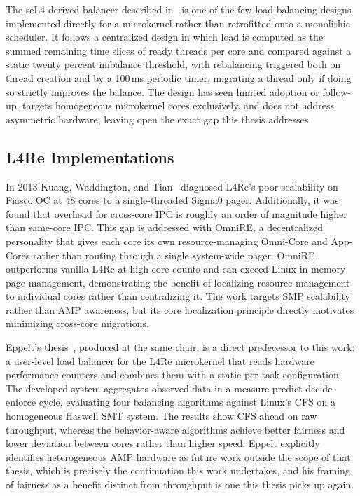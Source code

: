 The seL4-derived balancer described in~\cite{global-dynamic-load-balancing} is one of the few load-balancing designs implemented directly for a microkernel rather than retrofitted onto a monolithic scheduler.
It follows a centralized design in which load is computed as the summed remaining time slices of ready threads per core and compared against a static twenty percent imbalance threshold, with rebalancing triggered both on thread creation and by a 100\,\si{\ms} periodic timer, migrating a thread only if doing so strictly improves the balance.
The design has seen limited adoption or follow-up, targets homogeneous microkernel cores exclusively, and does not address asymmetric hardware, leaving open the exact gap this thesis addresses.

\subsection{L4Re Implementations}

In 2013 Kuang, Waddington, and Tian~\cite{omnire} diagnosed L4Re's poor scalability on Fiasco.OC at 48 cores to a single-threaded Sigma0 pager.
Additionally, it was found that overhead for cross-core IPC is roughly an order of magnitude higher than same-core IPC.
This gap is addressed with OmniRE, a decentralized personality that gives each core its own resource-managing Omni-Core and App-Cores rather than routing through a single system-wide pager.
OmniRE outperforms vanilla L4Re at high core counts and can exceed Linux in memory page management, demonstrating the benefit of localizing resource management to individual cores rather than centralizing it.
The work targets SMP scalability rather than AMP awareness, but its core localization principle directly motivates minimizing cross-core migrations.

Eppelt's thesis~\cite{philipp-thesis}, produced at the same chair, is a direct predecessor to this work: a user-level load balancer for the L4Re microkernel that reads hardware performance counters and combines them with a static per-task configuration.
The developed system aggregates observed data in a measure-predict-decide-enforce cycle, evaluating four balancing algorithms against Linux's CFS on a homogeneous Haswell SMT system.
The results show CFS ahead on raw throughput, whereas the behavior-aware algorithms achieve better fairness and lower deviation between cores rather than higher speed.
Eppelt explicitly identifies heterogeneous AMP hardware as future work outside the scope of that thesis, which is precisely the continuation this work undertakes, and his framing of fairness as a benefit distinct from throughput is one this thesis picks up again.

